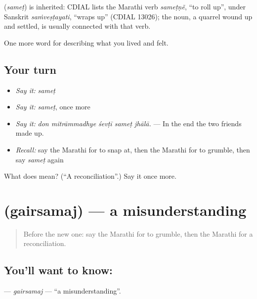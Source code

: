 \begin{cousinweb}
\textbf{} (\emph{sameṭ}) is inherited: CDIAL lists the Marathi verb \emph{sameṭṇẽ}, \textquotedblleft{}to roll up\textquotedblright{}, under Sanskrit \emph{saṁveṣṭayati}, \textquotedblleft{}wraps up\textquotedblright{} (CDIAL 13026); the noun, a quarrel wound up and settled, is usually connected with that verb.
\end{cousinweb}

\begin{grammarlens}[title={What you've built}]
One more word for describing what you lived and felt.
\end{grammarlens}

\subsection*{Your turn}
\begin{itemize}
\raggedright
  \item \emph{Say it:} \emph{sameṭ}
  \item \emph{Say it:} \emph{sameṭ}, once more
  \item \emph{Say it:} \emph{don mitrāmmadhye śevṭī sameṭ jhālā.} — In the end the two friends made up.
  \item \emph{Recall:} say the Marathi for to snap at, then the Marathi for to grumble, then say \emph{sameṭ} again
\end{itemize}

\begin{tcolorbox}[breakable,colback=teal!4,colframe=teal!35!black,title={Before you move on}]
What does  mean? (\textquotedblleft{}A reconciliation\textquotedblright{}.) Say it once more.
\end{tcolorbox}
\section[\texorpdfstring{\mr{गैरसमज} (gairsamaj)}{गैरसमज (gairsamaj)}]{ (gairsamaj) — a misunderstanding}

\label{lesson:MR-C454-gairsamaj}



\begin{quote}
Before the new one: say the Marathi for to grumble, then the Marathi for a reconciliation.
\end{quote}

\subsection*{You'll want to know: }
\textbf{} — \emph{gairsamaj} — \textquotedblleft{}a misunderstanding\textquotedblright{}.

